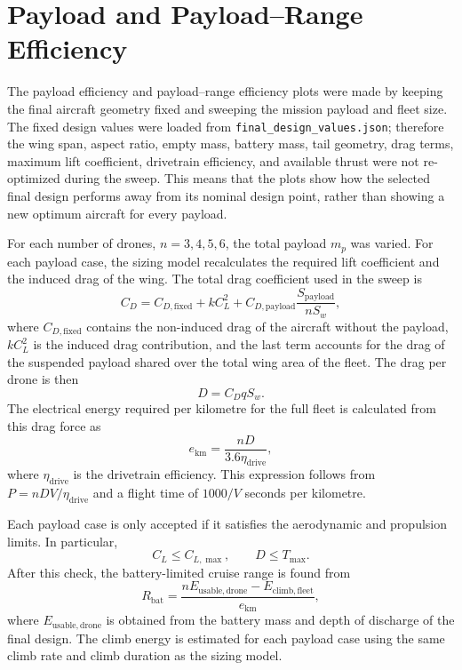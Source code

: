 \section{Payload and Payload--Range Efficiency}
\label{sec:payload-range-efficiency}

The payload efficiency and payload--range efficiency plots were made by keeping the
final aircraft geometry fixed and sweeping the mission payload and fleet size. The
fixed design values were loaded from \texttt{final\_design\_values.json}; therefore
the wing span, aspect ratio, empty mass, battery mass, tail geometry, drag terms,
maximum lift coefficient, drivetrain efficiency, and available thrust were not
re-optimized during the sweep. This means that the plots show how the selected final
design performs away from its nominal design point, rather than showing a new
optimum aircraft for every payload.

For each number of drones, \(n=3,4,5,6\), the total payload \(m_p\) was varied. For
each payload case, the sizing model recalculates the required lift coefficient and
the induced drag of the wing. The total drag coefficient used in the sweep is
\begin{equation}
    C_D =
    C_{D,\mathrm{fixed}}
    + k C_L^2
    + C_{D,\mathrm{payload}}
      \frac{S_\mathrm{payload}}{n S_w},
\end{equation}
where \(C_{D,\mathrm{fixed}}\) contains the non-induced drag of the aircraft without
the payload, \(kC_L^2\) is the induced drag contribution, and the last term accounts
for the drag of the suspended payload shared over the total wing area of the fleet.
The drag per drone is then
\begin{equation}
    D = C_D q S_w .
\end{equation}
The electrical energy required per kilometre for the full fleet is calculated from
this drag force as
\begin{equation}
    e_\mathrm{km} =
    \frac{nD}{3.6\eta_\mathrm{drive}},
\end{equation}
where \(\eta_\mathrm{drive}\) is the drivetrain efficiency. This expression follows
from \(P=nDV/\eta_\mathrm{drive}\) and a flight time of \(1000/V\) seconds per
kilometre.

Each payload case is only accepted if it satisfies the aerodynamic and propulsion
limits. In particular,
\begin{equation}
    C_L \leq C_{L,\max}, \qquad
    D \leq T_\mathrm{max}.
\end{equation}
After this check, the battery-limited cruise range is found from
\begin{equation}
    R_\mathrm{bat} =
    \frac{
        nE_{\mathrm{usable,drone}} - E_{\mathrm{climb,fleet}}
    }{e_\mathrm{km}},
\end{equation}
where \(E_{\mathrm{usable,drone}}\) is obtained from the battery mass and depth of
discharge of the final design. The climb energy is estimated for each payload case
using the same climb rate and climb duration as the sizing model.

